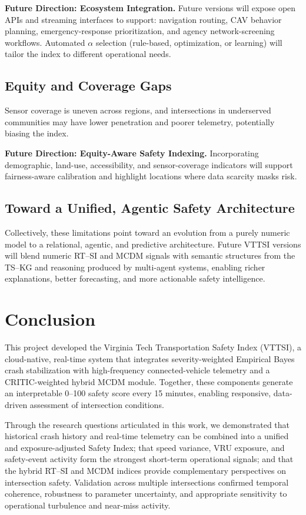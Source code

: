 \documentclass[conference]{IEEEtran}
\begin{document}
\textbf{Future Direction: Ecosystem Integration.}
Future versions will expose open APIs and streaming interfaces to support:
navigation routing, CAV behavior planning, emergency-response prioritization, and agency
network-screening workflows. Automated $\alpha$ selection (rule-based, optimization, or
learning) will tailor the index to different operational needs.

\subsection{Equity and Coverage Gaps}

Sensor coverage is uneven across regions, and intersections in underserved communities
may have lower penetration and poorer telemetry, potentially biasing the index.

\textbf{Future Direction: Equity-Aware Safety Indexing.}
Incorporating demographic, land-use, accessibility, and sensor-coverage indicators will
support fairness-aware calibration and highlight locations where data scarcity masks
risk.

\subsection{Toward a Unified, Agentic Safety Architecture}

Collectively, these limitations point toward an evolution from a purely numeric model to
a relational, agentic, and predictive architecture. Future VTTSI versions will blend
numeric RT--SI and MCDM signals with semantic structures from the TS--KG and reasoning
produced by multi-agent systems, enabling richer explanations, better forecasting, and
more actionable safety intelligence.

\section{Conclusion}
\label{sec:conclusion}

This project developed the Virginia Tech Transportation Safety Index (VTTSI), a
cloud-native, real-time system that integrates severity-weighted Empirical Bayes crash
stabilization with high-frequency connected-vehicle telemetry and a CRITIC-weighted
hybrid MCDM module. Together, these components generate an interpretable 0--100 safety
score every 15 minutes, enabling responsive, data-driven assessment of intersection
conditions.

Through the research questions articulated in this work, we demonstrated that historical
crash history and real-time telemetry can be combined into a unified and
exposure-adjusted Safety Index; that speed variance, VRU exposure, and safety-event
activity form the strongest short-term operational signals; and that the hybrid RT--SI
and MCDM indices provide complementary perspectives on intersection safety. Validation
across multiple intersections confirmed temporal coherence, robustness to parameter
uncertainty, and appropriate sensitivity to operational turbulence and near-miss
activity.
\end{document}
